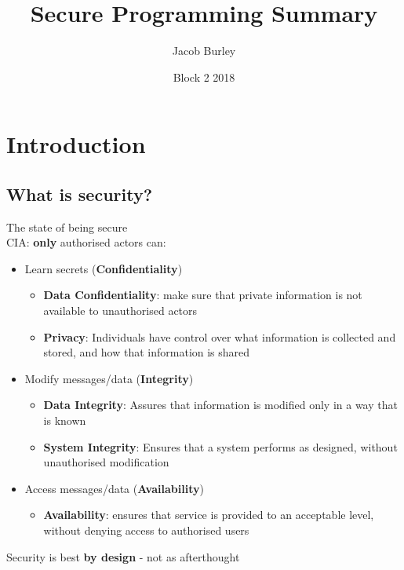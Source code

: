 \documentclass{article}
\title{Secure Programming Summary}
\author{Jacob Burley}
\date{Block 2 2018}
\begin{document}
\maketitle

\tableofcontents
\newpage
\section{Introduction}
\subsection{What is security?}
The state of being secure
\\CIA: \textbf{only} authorised actors can:
\begin{itemize}
    \item Learn secrets (\textbf{Confidentiality})
    \begin{itemize}
        \item \textbf{Data Confidentiality}: make sure that private information is not available to unauthorised actors
        \item \textbf{Privacy}: Individuals have control over what information is collected and stored, and how that information is shared
    \end{itemize}
    \item Modify messages/data (\textbf{Integrity})
    \begin{itemize}
        \item \textbf{Data Integrity}: Assures that information is modified only in a way that is known
        \item \textbf{System Integrity}: Ensures that a system performs as designed, without unauthorised modification
    \end{itemize}
    \item Access messages/data (\textbf{Availability})
    \begin{itemize}
        \item \textbf{Availability}: ensures that service is provided to an acceptable level, without denying access to authorised users
    \end{itemize}
\end{itemize}
Security is best \textbf{by design} - not as afterthought
\end{document}
